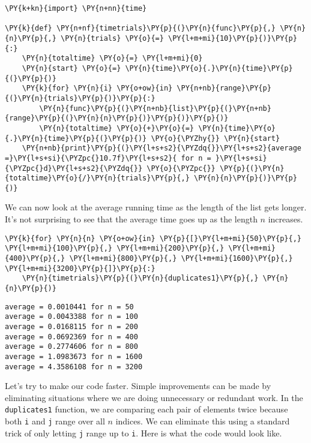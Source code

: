 \begin{Verbatim}[commandchars=\\\{\}]
\PY{k+kn}{import} \PY{n+nn}{time}

\PY{k}{def} \PY{n+nf}{timetrials}\PY{p}{(}\PY{n}{func}\PY{p}{,} \PY{n}{n}\PY{p}{,} \PY{n}{trials} \PY{o}{=} \PY{l+m+mi}{10}\PY{p}{)}\PY{p}{:}
    \PY{n}{totaltime} \PY{o}{=} \PY{l+m+mi}{0}
    \PY{n}{start} \PY{o}{=} \PY{n}{time}\PY{o}{.}\PY{n}{time}\PY{p}{(}\PY{p}{)}
    \PY{k}{for} \PY{n}{i} \PY{o+ow}{in} \PY{n+nb}{range}\PY{p}{(}\PY{n}{trials}\PY{p}{)}\PY{p}{:}
        \PY{n}{func}\PY{p}{(}\PY{n+nb}{list}\PY{p}{(}\PY{n+nb}{range}\PY{p}{(}\PY{n}{n}\PY{p}{)}\PY{p}{)}\PY{p}{)}
        \PY{n}{totaltime} \PY{o}{+}\PY{o}{=} \PY{n}{time}\PY{o}{.}\PY{n}{time}\PY{p}{(}\PY{p}{)} \PY{o}{\PYZhy{}} \PY{n}{start}
    \PY{n+nb}{print}\PY{p}{(}\PY{l+s+s2}{\PYZdq{}}\PY{l+s+s2}{average =}\PY{l+s+si}{\PYZpc{}10.7f}\PY{l+s+s2}{ for n = }\PY{l+s+si}{\PYZpc{}d}\PY{l+s+s2}{\PYZdq{}} \PY{o}{\PYZpc{}} \PY{p}{(}\PY{n}{totaltime}\PY{o}{/}\PY{n}{trials}\PY{p}{,} \PY{n}{n}\PY{p}{)}\PY{p}{)}
\end{Verbatim}



We can now look at the average running time as the length of the list gets longer.
It's not surprising to see that the average time goes up as the length $n$ increases.


\begin{Verbatim}[commandchars=\\\{\}]
\PY{k}{for} \PY{n}{n} \PY{o+ow}{in} \PY{p}{[}\PY{l+m+mi}{50}\PY{p}{,} \PY{l+m+mi}{100}\PY{p}{,} \PY{l+m+mi}{200}\PY{p}{,} \PY{l+m+mi}{400}\PY{p}{,} \PY{l+m+mi}{800}\PY{p}{,} \PY{l+m+mi}{1600}\PY{p}{,} \PY{l+m+mi}{3200}\PY{p}{]}\PY{p}{:}
    \PY{n}{timetrials}\PY{p}{(}\PY{n}{duplicates1}\PY{p}{,} \PY{n}{n}\PY{p}{)}
\end{Verbatim}

\begin{Verbatim}
average = 0.0010441 for n = 50
average = 0.0043388 for n = 100
average = 0.0168115 for n = 200
average = 0.0692369 for n = 400
average = 0.2774606 for n = 800
average = 1.0983673 for n = 1600
average = 4.3586108 for n = 3200

\end{Verbatim}


Let's try to make our code faster.
Simple improvements can be made by eliminating situations where we are doing unnecessary or redundant work.
In the \texttt{duplicates1} function, we are comparing each pair of elements twice because both \texttt{i} and \texttt{j} range over all $n$ indices.
We can eliminate this using a standard trick of only letting \texttt{j} range up to \texttt{i}.
Here is what the code would look like.

